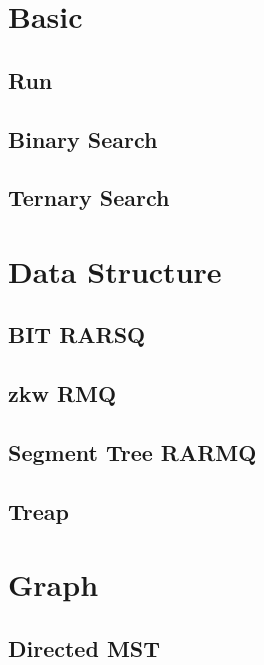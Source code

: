 \section{Basic}
    \subsection{Run}
        
    \subsection{Binary Search}
         
    \subsection{Ternary Search}
         

\section{Data Structure}
    \subsection{BIT RARSQ}
        
    \subsection{zkw RMQ}
        
    \subsection{Segment Tree RARMQ}
        
    \subsection{Treap}
        

\section{Graph}
    \subsection{Directed MST}
        
